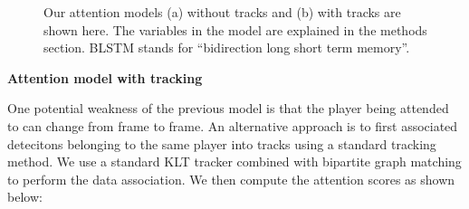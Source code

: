 \begin{figure}[t!]
\begin{center}

\end{center}
   \caption{Our attention models (a) without tracks and (b) with tracks are
   shown here. The variables in the model are explained in the methods
 section.
BLSTM stands for ``bidirection long short term memory''.
}
\label{fig:model}
\end{figure}


\noindent \textbf{Attention model with tracking}

One potential weakness of the previous model is that the
player being attended to can change from frame to frame.
An alternative approach is to first associated detecitons
belonging to the same player into tracks using a standard
tracking method. We use a standard KLT tracker combined with
bipartite graph matching to perform the data association.
We then compute the attention scores as shown below:


